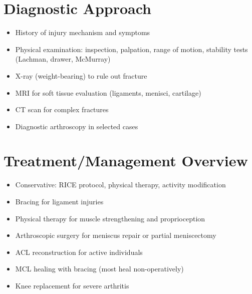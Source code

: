 \section{Diagnostic Approach}
\begin{itemize}
\item History of injury mechanism and symptoms
\item Physical examination: inspection, palpation, range of motion, stability tests (Lachman, drawer, McMurray)
\item X-ray (weight-bearing) to rule out fracture
\item MRI for soft tissue evaluation (ligaments, menisci, cartilage)
\item CT scan for complex fractures
\item Diagnostic arthroscopy in selected cases
\end{itemize}

\section{Treatment/Management Overview}
\begin{itemize}
\item Conservative: RICE protocol, physical therapy, activity modification
\item Bracing for ligament injuries
\item Physical therapy for muscle strengthening and proprioception
\item Arthroscopic surgery for meniscus repair or partial meniscectomy
\item ACL reconstruction for active individuals
\item MCL healing with bracing (most heal non-operatively)
\item Knee replacement for severe arthritis
\end{itemize}
